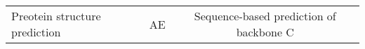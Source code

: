 \begin{center}
\begin{tabular}{l c c}
    Preotein structure prediction & AE & Sequence-based prediction of backbone C
\end{tabular}
\end{center}